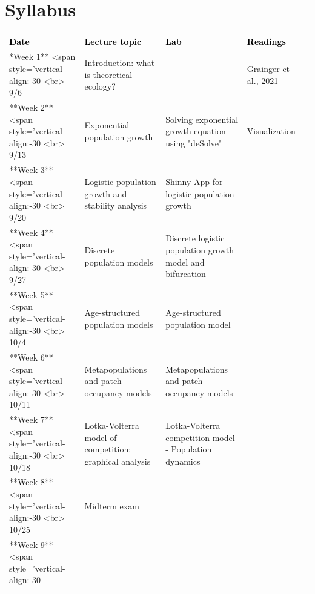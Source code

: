 \documentclass[
]{book}
\begin{document}
\hypertarget{syllabus}{%
\chapter*{Syllabus}\label{syllabus}}

\begingroup\fontsize{17}{19}\selectfont

\begin{tabu} to 
\hline
\begingroup\fontsize{20}{22}\selectfont \textcolor{black}{\textbf{Date}}\endgroup & \begingroup\fontsize{20}{22}\selectfont \textcolor{black}{\textbf{Lecture topic}}\endgroup & \begingroup\fontsize{20}{22}\selectfont \textcolor{black}{\textbf{Lab}}\endgroup & \begingroup\fontsize{20}{22}\selectfont \textcolor{black}{\textbf{Readings}}\endgroup\\
\hline
**Week 1** <span style='vertical-align:-30%
           <br> 9/6 & Introduction: what is theoretical ecology? & \- & Grainger et al., 2021\\
\hline
**Week 2** <span style='vertical-align:-30%
           <br> 9/13 & Exponential population growth & Solving exponential growth equation using "deSolve" & Visualization & \-\\
\hline
**Week 3** <span style='vertical-align:-30%
           <br> 9/20 & Logistic population growth and stability analysis & Shinny App for logistic population growth & \-\\
\hline
**Week 4** <span style='vertical-align:-30%
           <br> 9/27 & Discrete population models & Discrete logistic population growth model and bifurcation & \-\\
\hline
**Week 5** <span style='vertical-align:-30%
           <br> 10/4 & Age-structured population models & Age-structured population model & \-\\
\hline
**Week 6** <span style='vertical-align:-30%
           <br> 10/11 & Metapopulations and patch occupancy models & Metapopulations and patch occupancy models & \-\\
\hline
**Week 7** <span style='vertical-align:-30%
           <br> 10/18 & Lotka-Volterra model of competition: graphical analysis & Lotka-Volterra competition model - Population dynamics & \-\\
\hline
**Week 8** <span style='vertical-align:-30%
           <br> 10/25 & Midterm exam & \- & \-\\
\hline
**Week 9** <span style='vertical-align:-30%

\end{tabu}
\end{document}
